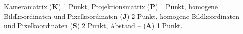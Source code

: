 %
%
%
%
%
%
%
%
%
%
%
%
%
%
%
%
%
%
%
%
%
%
%
%
%
%
%
%
\begin{bewertung}
Kameramatrix ({\bf K}) 1 Punkt,
Projektionsmatrix ({\bf P}) 1 Punkt,
homogene Bildkoordinaten und Pixelkoordinaten \jupiter{} ({\bf J}) 2 Punkt,
homogene Bildkoordinaten und Pixelkoordinaten \saturn{} ({\bf S}) 2 Punkt,
Abstand \jupiter--\saturn{} ({\bf A}) 1 Punkt.
\end{bewertung}

